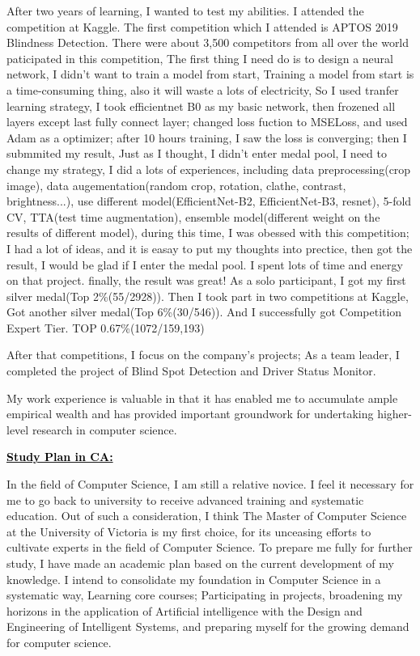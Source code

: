 \documentclass[12pt]{article}
\newcommand{\statement}[1]{\par\medskip
  \underline{\textcolor{black}{\textbf{#1:}}}\space
}
\begin{document}
\bigskip

After two years of learning, I wanted to test my abilities. I attended the competition at Kaggle. The first competition which I attended is APTOS 2019 Blindness Detection. There were about 3,500 competitors from all over the world paticipated in this competition, The first thing I need do is to design a neural network, I didn't want to train a model from start, Training a model from start is a time-consuming thing, also it will waste a lots of electricity, So I used tranfer learning strategy, I took efficientnet B0 as my basic network, then frozened all layers except last fully connect layer; changed loss fuction to MSELoss, and used Adam as a optimizer; after 10 hours training, I saw the loss is converging; then I submmited my result, Just as I thought, I didn't enter medal pool, I need to change my strategy, I did a lots of experiences, including data preprocessing(crop image), data augementation(random crop, rotation, clathe, contrast, brightness...), use different model(EfficientNet-B2, EfficientNet-B3, resnet),  5-fold CV, TTA(test time augmentation), ensemble model(different weight on the results of different model), during this time, I was obessed with this competition; I had a lot of ideas, and it is easay to put my thoughts into prectice, then got the result, I would be glad if I enter the medal pool. I spent lots of time and energy on that project. finally, the result was great! As a solo participant, I got my first silver medal(Top 2\%(55/2928)). Then I took part in two competitions at Kaggle, Got another silver medal(Top 6\%(30/546)). And I successfully got Competition Expert Tier. TOP 0.67\%(1072/159,193)

\bigskip

After that competitions, I focus on the company's projects; As a team leader, I completed the project of Blind Spot Detection and Driver Status Monitor.

\bigskip

My work experience is valuable in that it has enabled me to accumulate ample empirical wealth and has provided important groundwork for undertaking higher-level research in computer science.

\bigskip

\statement{Study Plan in CA}

In the field of Computer Science, I am still a relative novice. I feel it necessary for me to go back to university to receive advanced training and systematic education. Out of such a consideration, I think The Master of Computer Science at the University of Victoria is my first choice, for its unceasing efforts to cultivate experts in the field of Computer Science. To prepare me fully for further study, I have made an academic plan based on the current development of my knowledge. I intend to consolidate my foundation in Computer Science in a systematic way, Learning core courses; Participating in projects, broadening my horizons in the application of Artificial intelligence with the Design and Engineering of Intelligent Systems, and preparing myself for the growing demand for computer science. 
\end{document}
